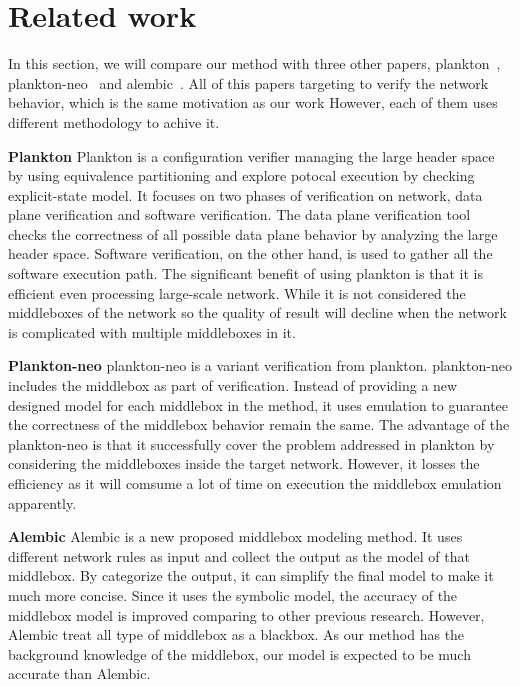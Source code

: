 \section{Related work}

In this section, we will compare our method with three other papers, \ci plankton~\cite{2017-Prabhu}, \cii plankton-neo~\cite{2018-PrabhuEtAl} and \ciii alembic~\cite{2019-MoonEtAl}.
All of this papers targeting to verify the network behavior, which is the same motivation as our work
However, each of them uses different methodology to achive it.

  \textbf{Plankton} Plankton is a configuration verifier managing the large header space by using equivalence partitioning and explore potocal execution by checking explicit-state model.
It focuses on two phases of verification on network, \ci data plane verification and \cii software verification.
The data plane verification tool checks the correctness of all possible data plane behavior by analyzing the large header space.
Software verification, on the other hand, is used to gather all the software execution path.
The significant benefit of using plankton is that it is efficient even processing large-scale network.
While it is not considered the middleboxes of the network so the quality of result will decline when the network is complicated with multiple middleboxes in it.

  \textbf{Plankton-neo} plankton-neo is a variant verification from plankton.
plankton-neo includes the middlebox as part of verification.
Instead of providing a new designed model for each middlebox in the method, it uses emulation to guarantee the correctness of the middlebox behavior remain the same.
The advantage of the plankton-neo is that it successfully cover the problem addressed in plankton by considering the middleboxes inside the target network.
However, it losses the efficiency as it will comsume a lot of time on execution the middlebox emulation apparently.

  \textbf{Alembic} Alembic is a new proposed middlebox modeling method.
It uses different network rules as input and collect the output as the model of that middlebox.
By categorize the output, it can simplify the final model to make it much more concise.
Since it uses the symbolic model, the accuracy of the middlebox model is improved comparing to other previous research.
However, Alembic treat all type of middlebox as a blackbox.
As our method has the background knowledge of the middlebox, our model is expected to be much accurate than Alembic.

